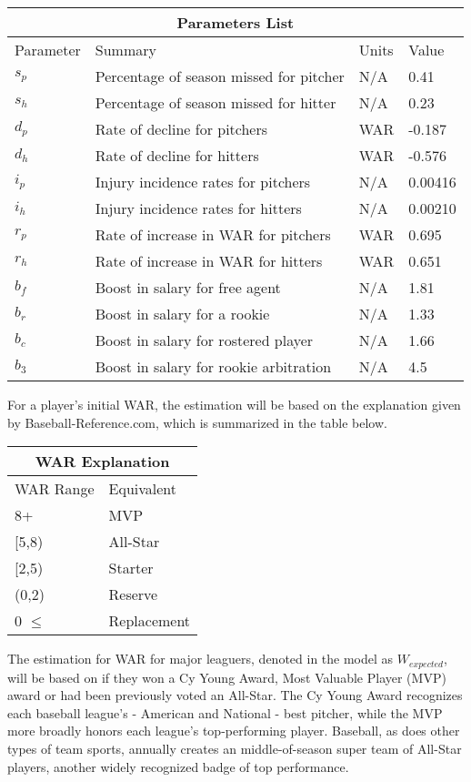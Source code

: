 \documentclass[12pt]{article}
\begin{document}
\begin{center}
\begin{tabular}{ |p{2.3cm}||p{7cm}||p{1.5cm}||p{1.5cm}|  }
\hline
\multicolumn{4}{|c|}{Parameters List} \\
\hline
Parameter  & Summary & Units & Value\\
\hline
$s_p$  & Percentage of season missed for pitcher  & N/A & 0.41 \\
\hline
$s_h$ &   Percentage of season missed for hitter & N/A & 0.23\\
\hline
$d_p$ & Rate of decline for pitchers & WAR & -0.187 \\
\hline
$d_h$ & Rate of decline for hitters & WAR & -0.576 \\
\hline
$i_p$ & Injury incidence rates for pitchers & N/A & 0.00416 \\
 \hline
 $i_h$ & Injury incidence rates for hitters & N/A & 0.00210 \\
 \hline
 $r_p$ & Rate of increase in WAR for pitchers & WAR & 0.695 \\
  \hline
  $r_h$ & Rate of increase in WAR for hitters & WAR & 0.651 \\
  \hline
   $b_f$ & Boost in salary for free agent & N/A & 1.81 \\
  \hline
  $b_{r}$ & Boost in salary for a rookie & N/A & 1.33 \\
  \hline
  $b_c$ & Boost in salary for rostered player & N/A & 1.66 \\
  \hline
  $b_3$ & Boost in salary for rookie arbitration & N/A & 4.5 \\
  \hline
\end{tabular}
\end{center}
For a player's initial WAR, the estimation will be based on the explanation given by Baseball-Reference.com, which is summarized in the table below.\\
\begin{center}
\begin{tabular}{ |p{2.3cm}||p{5cm}|  }
\hline
\multicolumn{2}{|c|}{WAR Explanation} \\
\hline
WAR Range  & Equivalent \\
\hline
8+  & MVP  \\
\hline
[5,8) &   All-Star\\
\hline
[2,5) & Starter \\
\hline
(0,2)  & Reserve \\
\hline
0 $\leq$ & Replacement \\
 \hline
\end{tabular}
\end{center}
The estimation for WAR for major leaguers, denoted in the model as $W_{expected}$, will be based on if they won a Cy Young Award, Most Valuable Player (MVP) award or had been previously voted an All-Star.  The Cy Young Award recognizes each baseball league's - American and National - best pitcher, while the MVP more broadly honors each league's top-performing player.  Baseball, as does other types of team sports, annually creates an middle-of-season super team of All-Star players, another widely recognized badge of top performance.  \\
\end{document}
